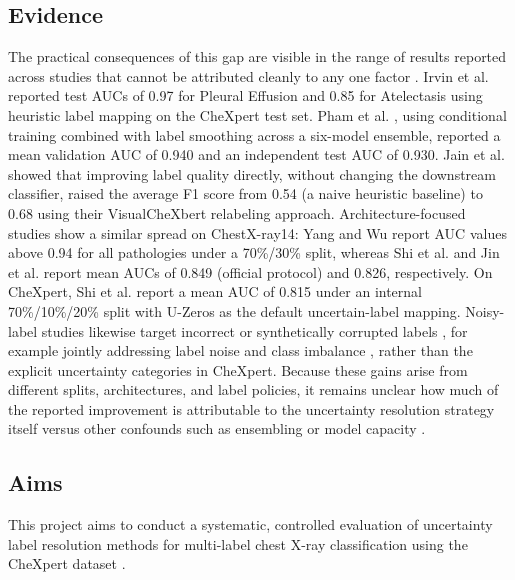 \documentclass[conference]{IEEEtran}
\begin{document}
\subsection{Evidence}
The practical consequences of this gap are visible in the range of results reported across studies that cannot be attributed cleanly to any one factor \cite{ref1,ref5,ref6,ref10,ref13,ref16}. Irvin et al. \cite{ref1} reported test AUCs of 0.97 for Pleural Effusion and 0.85 for Atelectasis using heuristic label mapping on the CheXpert test set. Pham et al. \cite{ref5}, using conditional training combined with label smoothing across a six-model ensemble, reported a mean validation AUC of 0.940 and an independent test AUC of 0.930. Jain et al. \cite{ref6} showed that improving label quality directly, without changing the downstream classifier, raised the average F1 score from 0.54 (a naive heuristic baseline) to 0.68 using their VisualCheXbert relabeling approach. Architecture-focused studies show a similar spread on ChestX-ray14: Yang and Wu \cite{ref13} report AUC values above 0.94 for all pathologies under a 70\%/30\% split, whereas Shi et al. \cite{ref10} and Jin et al. \cite{ref16} report mean AUCs of 0.849 (official protocol) and 0.826, respectively. On CheXpert, Shi et al. \cite{ref10} report a mean AUC of 0.815 under an internal 70\%/10\%/20\% split with U-Zeros as the default uncertain-label mapping. Noisy-label studies likewise target incorrect or synthetically corrupted labels \cite{ref14,ref15}, for example jointly addressing label noise and class imbalance \cite{ref17}, rather than the explicit uncertainty categories in CheXpert. Because these gains arise from different splits, architectures, and label policies, it remains unclear how much of the reported improvement is attributable to the uncertainty resolution strategy itself versus other confounds such as ensembling \cite{ref5} or model capacity \cite{ref10,ref14,ref16}.

\subsection{Aims}
This project aims to conduct a systematic, controlled evaluation of uncertainty label resolution methods for multi-label chest X-ray classification using the CheXpert dataset \cite{ref1}.
\end{document}
